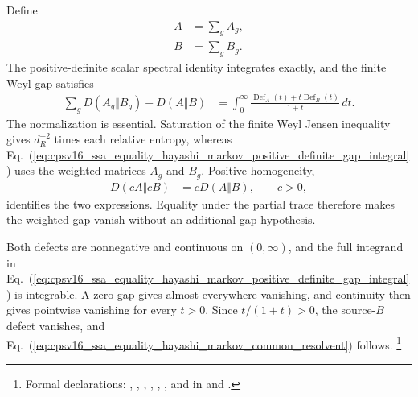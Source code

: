 \documentclass[11pt]{article}
\begin{document}
Define
\begin{align}
    A
        &=\sum_gA_g,
    \label{eq:cpsv16_ssa_equality_hayashi_markov_summed_state}\\
    B
        &=\sum_gB_g.
    \label{eq:cpsv16_ssa_equality_hayashi_markov_summed_reference}
\end{align}
The positive-definite scalar spectral identity integrates exactly, and the
finite Weyl gap satisfies
\begin{align}
    \sum_gD(A_g\Vert B_g)-D(A\Vert B)
        &=
        \int_0^\infty
        \frac{\operatorname{Def}_A(t)+t\operatorname{Def}_B(t)}
             {1+t}\,dt.
    \label{eq:cpsv16_ssa_equality_hayashi_markov_positive_definite_gap_integral}
\end{align}
The normalization is essential. Saturation of the finite Weyl Jensen
inequality gives $d_R^{-2}$ times each relative entropy, whereas
Eq.~(\ref{eq:cpsv16_ssa_equality_hayashi_markov_positive_definite_gap_integral})
uses the weighted matrices $A_g$ and $B_g$. Positive homogeneity,
\begin{align}
    D(cA\Vert cB)
        &=cD(A\Vert B),
        \qquad c>0,
    \label{eq:cpsv16_ssa_equality_hayashi_markov_relative_entropy_homogeneity}
\end{align}
identifies the two expressions. Equality under the partial trace therefore
makes the weighted gap vanish without an additional gap hypothesis.

Both defects are nonnegative and continuous on $(0,\infty)$, and the full
integrand in
Eq.~(\ref{eq:cpsv16_ssa_equality_hayashi_markov_positive_definite_gap_integral})
is integrable. A zero gap gives almost-everywhere vanishing, and continuity
then gives pointwise vanishing for every $t>0$. Since $t/(1+t)>0$, the
source-$B$ defect vanishes, and
Eq.~(\ref{eq:cpsv16_ssa_equality_hayashi_markov_common_resolvent}) follows.%
\footnote{Formal declarations:
,
,
,
,
,
, and
 in
 and
.}
\end{document}
